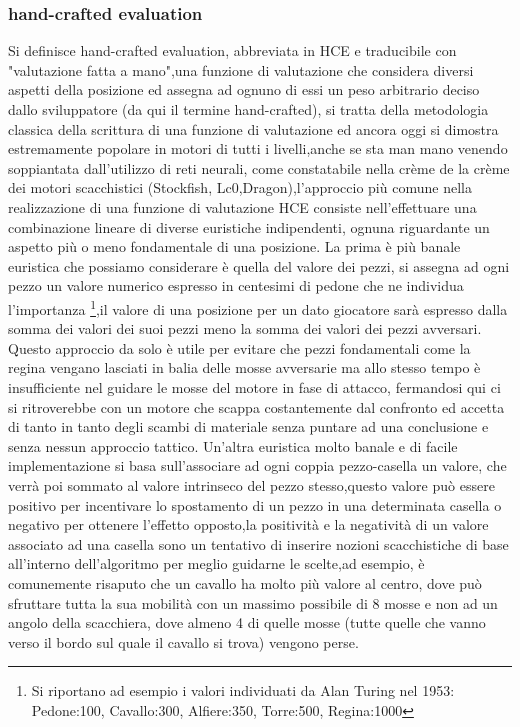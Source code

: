 \subsubsection {hand-crafted evaluation}
Si definisce hand-crafted evaluation, abbreviata in HCE e traducibile con "valutazione fatta a mano",una funzione di valutazione che considera diversi aspetti della posizione ed assegna ad ognuno di essi un peso 
arbitrario deciso dallo sviluppatore (da qui il termine hand-crafted), si tratta della metodologia classica della scrittura di  una funzione di valutazione ed ancora oggi si dimostra estremamente popolare in  
motori di tutti i livelli,anche se sta man mano venendo soppiantata dall'utilizzo di reti neurali, come constatabile nella crème de la crème dei motori scacchistici (Stockfish, Lc0,Dragon),l'approccio più comune
nella realizzazione di una funzione di valutazione HCE consiste nell'effettuare una combinazione lineare di diverse euristiche indipendenti, ognuna riguardante un aspetto più o meno fondamentale di una posizione.
La prima è più banale euristica che possiamo considerare è quella del valore dei pezzi, si assegna ad ogni pezzo un valore numerico espresso in centesimi di pedone che ne individua l'importanza \footnote{Si riportano ad esempio i valori individuati
da Alan Turing nel 1953: Pedone:100, Cavallo:300, Alfiere:350, Torre:500, Regina:1000},il valore di una posizione per un dato giocatore sarà espresso dalla somma dei valori dei suoi pezzi meno la somma dei valori dei pezzi avversari.
Questo approccio da solo è utile per evitare che  pezzi fondamentali come la regina vengano lasciati in balia delle mosse avversarie ma allo stesso tempo è insufficiente nel guidare le mosse del motore in fase di attacco,
fermandosi qui ci si ritroverebbe con un motore che scappa costantemente dal confronto ed accetta di tanto in tanto degli scambi di materiale senza puntare ad una conclusione e senza nessun approccio tattico.
Un'altra euristica molto banale e di facile implementazione si basa sull'associare ad ogni coppia pezzo-casella un valore, che verrà poi sommato al valore intrinseco del pezzo stesso,questo valore può essere positivo
per incentivare lo spostamento di un pezzo in una determinata casella o negativo per ottenere l'effetto opposto,la positività e la negatività di un valore associato ad una casella sono un tentativo di inserire 
nozioni scacchistiche di base all'interno dell'algoritmo per meglio guidarne le scelte,ad esempio, è comunemente risaputo che un cavallo ha molto più valore al centro, dove può sfruttare tutta la sua mobilità 
con un massimo possibile di 8 mosse e non ad un angolo della scacchiera, dove almeno 4 di quelle mosse  (tutte quelle che vanno verso il bordo sul quale il cavallo si trova) vengono perse.

